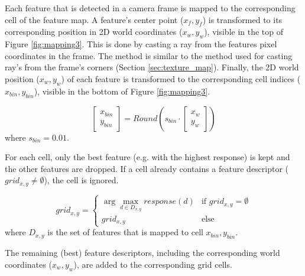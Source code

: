 Each feature that is detected in a camera frame is mapped to the corresponding cell of the feature map.
A feature's center point ($x_f, y_f$) is transformed to its corresponding position in 2D world coordinates ($x_w, y_w$), visible in the top of Figure \ref{fig:mapping3}.
This is done by casting a ray from the features pixel coordinates in the frame.
The method is similar to the method used for casting ray's from the frame's corners (Section \ref{sec:texture_map}).
Finally, the 2D world position ($x_w, y_w$) of each feature is transformed to the corresponding cell indices ($x_{bin}, y_{bin}$), visible in the bottom of Figure \ref{fig:mapping3}.

\begin{equation}
\left[ {
\begin{array}{c} x_{bin} \\ y_{bin} \end{array}
} \right]
=
Round(
s_{bin}
\cdot
\left[ {
\begin{array}{c} x_{w} \\ y_{w} \end{array}
} \right]
)
\end{equation}
where $s_{bin} = 0.01$.

For each cell, only the best feature (e.g. with the highest response) is kept and the other features are dropped.
If a cell already contains a feature descriptor ($grid_{x,y} \neq \emptyset$), the cell is ignored.

\begin{equation}
grid_{x,y} = 
\begin{cases}
\arg\max_{d \in D_{x,y}} response(d) & \mbox{if }  grid_{x,y} = \emptyset \\
grid_{x,y}   &   \mbox{else}
\end{cases} 
\end{equation}
where $D_{x,y}$ is the set of features that is mapped to cell $x_{bin} ,y_{bin}$.

The remaining (best) feature descriptors, including the corresponding world coordinates ($x_w, y_w$), are added to the corresponding grid cells.


